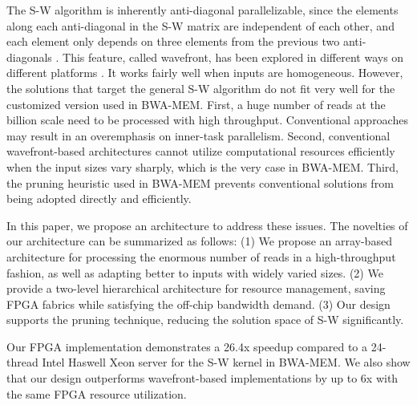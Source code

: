 The S-W algorithm is inherently anti-diagonal parallelizable, since the elements along each anti-diagonal in the S-W matrix are independent of each other, and each element only depends on three elements from the previous two anti-diagonals \cite{Edmiston1988}. 
This feature, called wavefront, has been explored in different ways on different platforms \cite{Preusser2012}\cite{RaceLogic}\cite{Zhang2007}\cite{Kim2011}\cite{Lam2013}. 
It works fairly well when inputs are homogeneous. 
However, the solutions that target the general S-W algorithm do not fit very well for the customized version used in BWA-MEM. 
First, a huge number of reads at the billion scale need to be processed with high throughput. 
Conventional approaches may result in an overemphasis on inner-task parallelism. 
Second, conventional wavefront-based architectures cannot utilize computational resources efficiently when the input sizes vary sharply, which is the very case in BWA-MEM. 
Third, the pruning heuristic used in BWA-MEM prevents conventional solutions from being adopted directly and efficiently.

In this paper, we propose an architecture to address these issues.
The novelties of our architecture can be summarized as follows: 
(1) We propose an array-based architecture for processing the enormous number of reads in a high-throughput fashion, as well as adapting better to inputs with widely varied sizes. 
(2) We provide a two-level hierarchical architecture for resource management, saving FPGA fabrics while satisfying the off-chip bandwidth demand.
(3) Our design supports the pruning technique, reducing the solution space of S-W significantly. 

Our FPGA implementation demonstrates a 26.4x speedup compared to a 24-thread Intel Haswell Xeon server for the S-W kernel in BWA-MEM. 
We also show that our design outperforms wavefront-based implementations by up to 6x with the same FPGA resource utilization.
